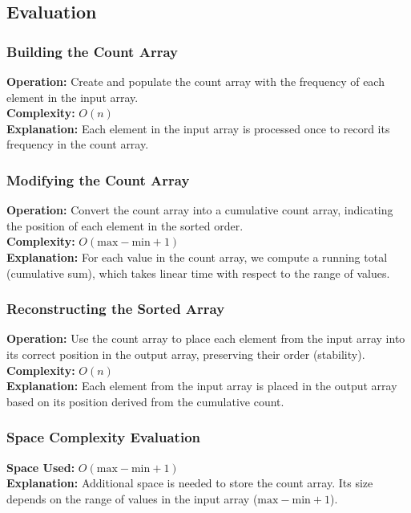 \subsection{Evaluation}
\subsubsection{Building the Count Array}
\textbf{Operation:} Create and populate the count array with the frequency of each element in the input array. \\
\textbf{Complexity:} \(O(n)\) \\
\textbf{Explanation:} Each element in the input array is processed once to record its frequency in the count array.

\subsubsection{Modifying the Count Array}
\textbf{Operation:} Convert the count array into a cumulative count array, indicating the position of each element in the sorted order. \\
\textbf{Complexity:} \(O(\text{max} - \text{min} + 1)\) \\
\textbf{Explanation:} For each value in the count array, we compute a running total (cumulative sum), which takes linear time with respect to the range of values.

\subsubsection{Reconstructing the Sorted Array}
\textbf{Operation:} Use the count array to place each element from the input array into its correct position in the output array, preserving their order (stability). \\
\textbf{Complexity:} \(O(n)\) \\
\textbf{Explanation:} Each element from the input array is placed in the output array based on its position derived from the cumulative count.

\subsubsection{Space Complexity Evaluation}
\textbf{Space Used:} \(O(\text{max} - \text{min} + 1)\) \\
\textbf{Explanation:} Additional space is needed to store the count array. Its size depends on the range of values in the input array (\(\text{max} - \text{min} + 1\)).


